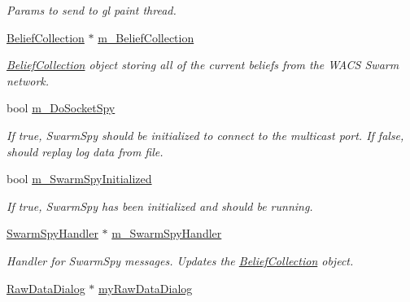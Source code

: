 \begin{DoxyCompactItemize}
\begin{DoxyCompactList}\small\item\em Params to send to gl paint thread. \end{DoxyCompactList}\item 
\hypertarget{class_three_d_viewer_a7626fed08d2676ae976a8f33f1d172e6}{
\hyperlink{class_belief_collection}{BeliefCollection} $\ast$ \hyperlink{class_three_d_viewer_a7626fed08d2676ae976a8f33f1d172e6}{m\_\-BeliefCollection}}
\label{class_three_d_viewer_a7626fed08d2676ae976a8f33f1d172e6}

\begin{DoxyCompactList}\small\item\em \hyperlink{class_belief_collection}{BeliefCollection} object storing all of the current beliefs from the WACS Swarm network. \end{DoxyCompactList}\item 
\hypertarget{class_three_d_viewer_a08073c902d3400e44f347cb104b21213}{
bool \hyperlink{class_three_d_viewer_a08073c902d3400e44f347cb104b21213}{m\_\-DoSocketSpy}}
\label{class_three_d_viewer_a08073c902d3400e44f347cb104b21213}

\begin{DoxyCompactList}\small\item\em If true, SwarmSpy should be initialized to connect to the multicast port. If false, should replay log data from file. \end{DoxyCompactList}\item 
\hypertarget{class_three_d_viewer_a62ef0f273d8a9ae7c9edc6dc16acc9a3}{
bool \hyperlink{class_three_d_viewer_a62ef0f273d8a9ae7c9edc6dc16acc9a3}{m\_\-SwarmSpyInitialized}}
\label{class_three_d_viewer_a62ef0f273d8a9ae7c9edc6dc16acc9a3}

\begin{DoxyCompactList}\small\item\em If true, SwarmSpy has been initialized and should be running. \end{DoxyCompactList}\item 
\hypertarget{class_three_d_viewer_a9f1f84724f43ade6d7021f8f766bebf4}{
\hyperlink{class_swarm_spy_handler}{SwarmSpyHandler} $\ast$ \hyperlink{class_three_d_viewer_a9f1f84724f43ade6d7021f8f766bebf4}{m\_\-SwarmSpyHandler}}
\label{class_three_d_viewer_a9f1f84724f43ade6d7021f8f766bebf4}

\begin{DoxyCompactList}\small\item\em Handler for SwarmSpy messages. Updates the \hyperlink{class_belief_collection}{BeliefCollection} object. \end{DoxyCompactList}\item 
\hypertarget{class_three_d_viewer_a9572ea596c4f86e1c7570784eae5e1a3}{
\hyperlink{class_raw_data_dialog}{RawDataDialog} $\ast$ \hyperlink{class_three_d_viewer_a9572ea596c4f86e1c7570784eae5e1a3}{myRawDataDialog}}
\label{class_three_d_viewer_a9572ea596c4f86e1c7570784eae5e1a3}


\end{DoxyCompactItemize}
